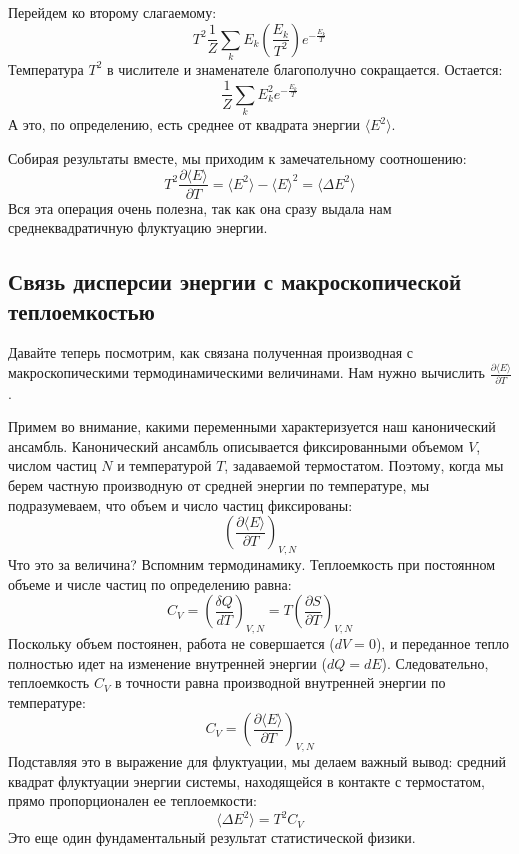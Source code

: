 \documentclass[../general/general]{subfiles}
\begin{document}
Перейдем ко второму слагаемому:
\begin{equation*}
    T^2 \frac{1}{Z} \sum_k E_k \left( \frac{E_k}{T^2} \right) e^{-\frac{E_k}{T}}
\end{equation*}
Температура $T^2$ в числителе и знаменателе благополучно сокращается. Остается:
\begin{equation*}
    \frac{1}{Z} \sum_k E_k^2 e^{-\frac{E_k}{T}}
\end{equation*}
А это, по определению, есть среднее от квадрата энергии $\langle E^2 \rangle$.

Собирая результаты вместе, мы приходим к замечательному соотношению:
\begin{equation}
    T^2 \frac{\partial \langle E \rangle}{\partial T} = \langle E^2 \rangle - \langle E \rangle^2 = \langle \Delta E^2 \rangle
\end{equation}
Вся эта операция очень полезна, так как она сразу выдала нам среднеквадратичную флуктуацию энергии.

\subsection{Связь дисперсии энергии с макроскопической теплоемкостью}

Давайте теперь посмотрим, как связана полученная производная с макроскопическими термодинамическими величинами. Нам нужно вычислить $\frac{\partial \langle E \rangle}{\partial T}$. 

Примем во внимание, какими переменными характеризуется наш канонический ансамбль. Канонический ансамбль описывается фиксированными объемом $V$, числом частиц $N$ и температурой $T$, задаваемой термостатом. Поэтому, когда мы берем частную производную от средней энергии по температуре, мы подразумеваем, что объем и число частиц фиксированы:
\begin{equation*}
    \left( \frac{\partial \langle E \rangle}{\partial T} \right)_{V, N}
\end{equation*}
Что это за величина? Вспомним термодинамику. Теплоемкость при постоянном объеме и числе частиц по определению равна:
\begin{equation*}
    C_V = \left( \frac{\delta Q}{dT} \right)_{V, N} = T \left( \frac{\partial S}{\partial T} \right)_{V, N}
\end{equation*}
Поскольку объем постоянен, работа не совершается ($dV = 0$), и переданное тепло полностью идет на изменение внутренней энергии ($dQ = dE$). Следовательно, теплоемкость $C_V$ в точности равна производной внутренней энергии по температуре:
\begin{equation*}
    C_V = \left( \frac{\partial \langle E \rangle}{\partial T} \right)_{V, N}
\end{equation*}
Подставляя это в выражение для флуктуации, мы делаем важный вывод: средний квадрат флуктуации энергии системы, находящейся в контакте с термостатом, прямо пропорционален ее теплоемкости:
\begin{equation}
    \langle \Delta E^2 \rangle = T^2 C_V
    \label{eq:energy_fluctuation_CV}
\end{equation}
Это еще один фундаментальный результат статистической физики.
\end{document}
